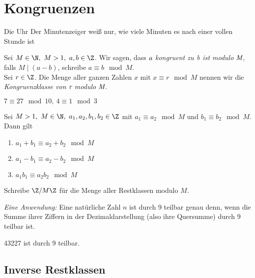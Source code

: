 \chapter{Kongruenzen}\video

\begin{exmp*}
	Die Uhr
	Der Minutenzeiger weiß nur, wie viele Minuten es nach einer vollen Stunde ist
\end{exmp*}

\begin{defn*}
	Sei $M \in \N,\ M > 1,\ a,b \in \Z$. Wir sagen, dass \emph{$\emph{a}$ kongruent zu $\emph{b}$ ist modulo $\emph{M}$}, falls \( M \mid (a-b) \), schreibe \( a \equiv b \mod M \).\\
	Sei $r \in \Z$. Die Menge aller ganzen Zahlen $x$ mit $x \equiv r \mod M$ nennen wir die \emph{Kongruenzklasse von $\emph{r}$ modulo $\emph{M}$}.
\end{defn*}

\begin{exmp*}
	\( 7 \equiv  27 \mod 10,\ 4 \equiv 1 \mod 3 \)
\end{exmp*}

\begin{lem}\autolabel
	Sei $M > 1,\ M \in \N,\ a_1,a_2,b_1,b_2 \in \Z$ mit $a_1 \equiv a_2 \mod M$ und $b_1 \equiv b_2 \mod M$. Dann gilt
	\begin{enumerate}[label={\roman*})]
		\item $a_1 + b_1 \equiv a_2 + b_2 \mod M$
		\item $a_1 - b_1 \equiv a_2 - b_2 \mod M$
		\item $a_1b_1 \equiv a_2b_2 \mod M$
	\end{enumerate}
\end{lem}

\begin{notat*}
	Schreibe \( \Z / M\Z \) für die Menge aller Restklassen modulo $M$.
\end{notat*}

\emph{Eine Anwendung:} Eine natürliche Zahl $n$ ist durch 9 teilbar genau denn, wenn die Summe ihrer Ziffern in der Dezimaldarstellung (also ihre Quersumme) durch 9 teilbar ist.

\begin{exmp*}
	43227 ist durch 9 teilbar.
\end{exmp*}

\section*{Inverse Restklassen}

